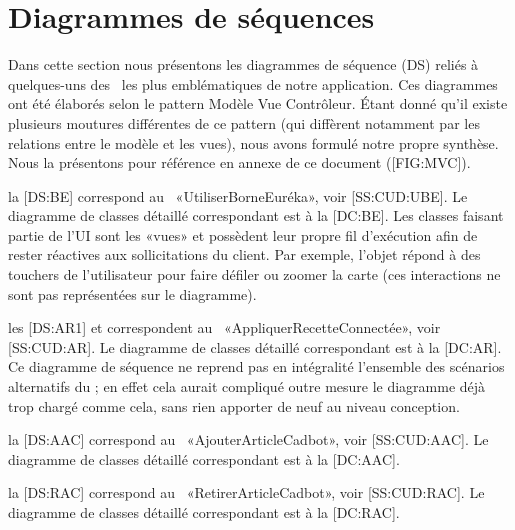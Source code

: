 \chapter{Diagrammes de séquences}

Dans cette section nous présentons les diagrammes de séquence (DS) reliés à quelques-uns des \cu\ les plus emblématiques de notre application.\crlf
Ces diagrammes ont été élaborés selon le pattern Modèle Vue Contrôleur. 
Étant donné qu'il existe plusieurs moutures différentes de ce pattern (qui diffèrent notamment par les relations entre le modèle et les vues), nous avons formulé notre propre synthèse. 
Nous la présentons pour référence en annexe de ce document ([FIG:MVC]).

\startitemize
\item la [DS:BE] correspond au \cu\ «UtiliserBorneEuréka», voir [SS:CUD:UBE].
Le diagramme de classes détaillé correspondant est à la [DC:BE].
Les classes faisant partie de l'UI sont les «vues» et possèdent leur propre fil d'exécution afin de rester réactives aux sollicitations du client.
Par exemple, l'objet  répond à des touchers de l'utilisateur pour faire défiler ou zoomer la carte (ces interactions ne sont pas représentées sur le diagramme).

\item les [DS:AR1] et \in[DS:AR2] correspondent au \cu\ «AppliquerRecetteConnectée», voir [SS:CUD:AR].
Le diagramme de classes détaillé correspondant est à la [DC:AR].
Ce diagramme de séquence ne reprend pas en intégralité l'ensemble des scénarios alternatifs du \cu; en effet cela aurait compliqué outre mesure le diagramme déjà trop chargé comme cela, sans rien apporter de neuf au niveau conception.

\item la [DS:AAC] correspond au \cu\ «AjouterArticleCadbot», voir [SS:CUD:AAC].
Le diagramme de classes détaillé correspondant est à la [DC:AAC].

\item la [DS:RAC] correspond au \cu\ «RetirerArticleCadbot», voir [SS:CUD:RAC].
Le diagramme de classes détaillé correspondant est à la [DC:RAC].


\stopitemize


{}

